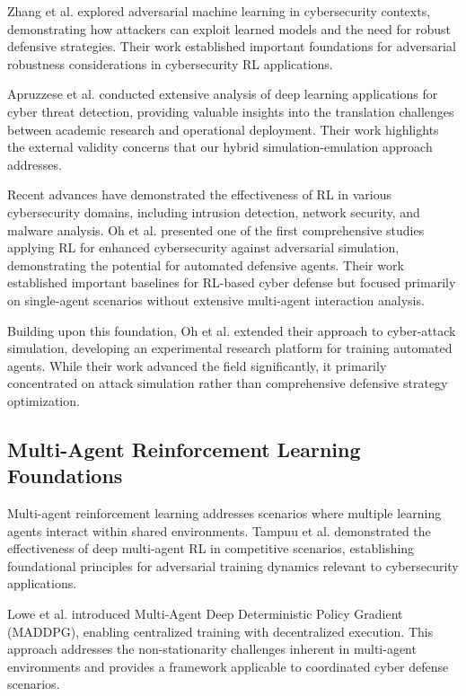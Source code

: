 \documentclass[12pt,oneside]{article}
\begin{document}
Zhang et al. \cite{zhang2020adversarial} explored adversarial machine learning in cybersecurity contexts, demonstrating how attackers can exploit learned models and the need for robust defensive strategies. Their work established important foundations for adversarial robustness considerations in cybersecurity RL applications.

Apruzzese et al. \cite{apruzzese2022deep} conducted extensive analysis of deep learning applications for cyber threat detection, providing valuable insights into the translation challenges between academic research and operational deployment. Their work highlights the external validity concerns that our hybrid simulation-emulation approach addresses.

Recent advances have demonstrated the effectiveness of RL in various cybersecurity domains, including intrusion detection, network security, and malware analysis. Oh et al. \cite{oh2023applying} presented one of the first comprehensive studies applying RL for enhanced cybersecurity against adversarial simulation, demonstrating the potential for automated defensive agents. Their work established important baselines for RL-based cyber defense but focused primarily on single-agent scenarios without extensive multi-agent interaction analysis.

Building upon this foundation, Oh et al. \cite{oh2024employing} extended their approach to cyber-attack simulation, developing an experimental research platform for training automated agents. While their work advanced the field significantly, it primarily concentrated on attack simulation rather than comprehensive defensive strategy optimization.

\subsection{Multi-Agent Reinforcement Learning Foundations}

Multi-agent reinforcement learning addresses scenarios where multiple learning agents interact within shared environments. Tampuu et al. \cite{tampuu2017multiagent} demonstrated the effectiveness of deep multi-agent RL in competitive scenarios, establishing foundational principles for adversarial training dynamics relevant to cybersecurity applications.

Lowe et al. \cite{lowe2017multi} introduced Multi-Agent Deep Deterministic Policy Gradient (MADDPG), enabling centralized training with decentralized execution. This approach addresses the non-stationarity challenges inherent in multi-agent environments and provides a framework applicable to coordinated cyber defense scenarios.
\end{document}
